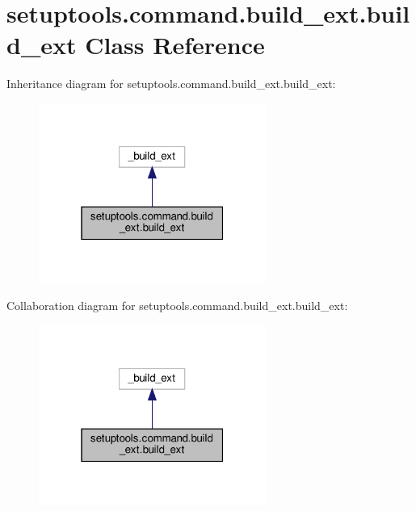 \hypertarget{classsetuptools_1_1command_1_1build__ext_1_1build__ext}{}\section{setuptools.\+command.\+build\+\_\+ext.\+build\+\_\+ext Class Reference}
\label{classsetuptools_1_1command_1_1build__ext_1_1build__ext}


Inheritance diagram for setuptools.\+command.\+build\+\_\+ext.\+build\+\_\+ext\+:
\nopagebreak
\begin{figure}[H]
\begin{center}
\leavevmode
\includegraphics[width=211pt]{classsetuptools_1_1command_1_1build__ext_1_1build__ext__inherit__graph}
\end{center}
\end{figure}


Collaboration diagram for setuptools.\+command.\+build\+\_\+ext.\+build\+\_\+ext\+:
\nopagebreak
\begin{figure}[H]
\begin{center}
\leavevmode
\includegraphics[width=211pt]{classsetuptools_1_1command_1_1build__ext_1_1build__ext__coll__graph}
\end{center}
\end{figure}
